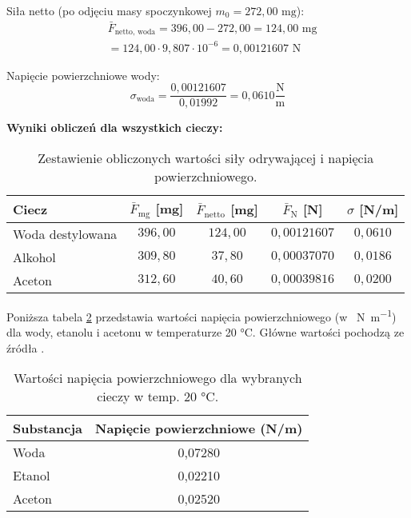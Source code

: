 \documentclass[a4paper,12pt]{article}
\begin{document}
Siła netto (po odjęciu masy spoczynkowej $m_0 = 272{,}00 \text{ mg}$):
\begin{align*}
     & \bar{F}_{\text{netto, woda}} = 396{,}00 - 272{,}00 = 124{,}00 \text{ mg} \\
     & = 124{,}00 \cdot 9{,}807 \cdot 10^{-6} = 0{,}00121607 \text{ N}
\end{align*}

Napięcie powierzchniowe wody:
$$
    \sigma_{\text{woda}} = \frac{0{,}00121607}{0{,}01992} = 0{,}0610 \frac{\text{N}}{\text{m}}
$$

\noindent\textbf{Wyniki obliczeń dla wszystkich cieczy:}

\begin{table}[H]
    \centering
    \begin{tabular}{|l|c|c|c|c|}
        \hline
        \textbf{Ciecz} & \textbf{$\bar{F}_{\text{mg}}$ [mg]} & \textbf{$\bar{F}_{\text{netto}}$ [mg]} & \textbf{$\bar{F}_{\text{N}}$ [N]} & \textbf{$\sigma$ [N/m]} \\
        \hline
        Woda destylowana & $396{,}00$ & $124{,}00$ & $0{,}00121607$ & $0{,}0610$ \\
        \hline
        Alkohol & $309{,}80$ & $37{,}80$ & $0{,}00037070$ & $0{,}0186$ \\
        \hline
        Aceton & $312{,}60$ & $40{,}60$ & $0{,}00039816$ & $0{,}0200$ \\
        \hline
    \end{tabular}
    \caption{Zestawienie obliczonych wartości siły odrywającej i napięcia powierzchniowego.}
    \label{tab:wyniki_obliczen_odrywanie}
\end{table}


Poniższa tabela \ref{tab:napiecia_powierzchniowe} przedstawia wartości napięcia powierzchniowego (w \SI{}{\newton\per\metre}) dla wody, etanolu i acetonu w temperaturze 20 °C. Główne wartości pochodzą ze źródła \cite{SurfaceTensionDE2024}.

\begin{table}[H]
    \centering
    \begin{tabular}{|l|c|}
        \toprule
        Substancja & Napięcie powierzchniowe (N/m) \\ %
        \midrule
        Woda       & 0,07280 \\ %
        \hline
        Etanol     & 0,02210 \\ %
        \hline
        Aceton     & 0,02520 \\ %
        \bottomrule
    \end{tabular}
    \caption{Wartości napięcia powierzchniowego dla wybranych cieczy w temp. 20 °C.}
    \label{tab:napiecia_powierzchniowe}
\end{table}
\end{document}
